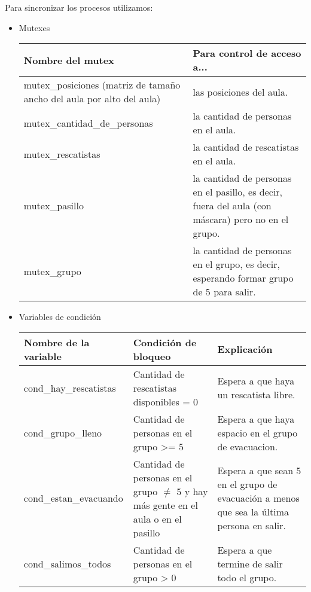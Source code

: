 Para sincronizar los procesos utilizamos:

\begin{itemize}
\item Mutexes
  \medskip

  \begin{tabular}{|p{7.5cm}|p{9cm}|}
  \hline
  \textbf{Nombre del mutex} & \textbf{Para control de acceso a...} \\
  \hline
  mutex\_posiciones (matriz de tamaño ancho del aula por alto del aula) & las posiciones del aula. \\
  \hline
  mutex\_cantidad\_de\_personas & la cantidad de personas en el aula. \\
  \hline
  mutex\_rescatistas & la cantidad de rescatistas en el aula. \\
  \hline
  mutex\_pasillo & la cantidad de personas en el pasillo, es decir, fuera del aula (con máscara) pero no en el grupo. \\
  \hline
  mutex\_grupo & la cantidad de personas en el grupo, es decir, esperando formar grupo de 5 para salir. \\
  \hline
  \end{tabular}

\item Variables de condición
  \medskip

  \begin{tabular}{|l|p{5cm}|p{7cm}|}
  \hline
  \textbf{Nombre de la variable} & \textbf{Condición de bloqueo} & \textbf{Explicación}  \\
  \hline
  cond\_hay\_rescatistas & Cantidad de rescatistas disponibles = 0 & Espera a que haya un rescatista libre. \\ %
  \hline
  cond\_grupo\_lleno & Cantidad de personas en el grupo >= 5 & Espera a que haya espacio en el grupo de evacuacion. \\ %
  \hline
  cond\_estan\_evacuando & Cantidad de personas en el grupo $\neq$ 5 y hay más gente en el aula o en el pasillo & Espera a que sean 5 en el grupo de 
    evacuación a menos que sea la última persona en salir. \\ %
  \hline
  cond\_salimos\_todos & Cantidad de personas en el grupo > 0 & Espera a que termine de salir todo el grupo. \\ %
  \hline
  \end{tabular}

\end{itemize}